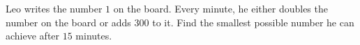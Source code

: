 Leo writes the number $1$ on the board. Every minute, he either doubles the number on the board or adds $300$ to it. Find the smallest possible number he can achieve after $15$ minutes.
